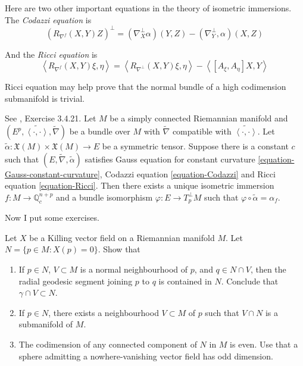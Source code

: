 \medskip\noindent

Here are two other important equations in the
theory of isometric immersions.
The {\it Codazzi equation} is
\begin{equation}
\label{equation-Codazzi}
(R_{\nabla^f}(X,Y)Z)^\perp
=(\nabla^\perp_X\alpha)(Y,Z)-(\nabla^\perp_Y,
\alpha)(X,Z)
\end{equation}

And the {\it Ricci equation} is
\begin{equation}
\label{equation-Ricci}
\left\langle{}R_{\nabla^f}(X,Y)\xi,\eta\right\rangle{}
=\left\langle{}R_{\nabla^\perp}(X,Y)\xi,\eta\right\rangle{}
-\left\langle{}[A_\xi,A_\eta]X,Y\right\rangle{}
\end{equation}

Ricci equation may help prove that the normal
bundle of a high codimension
submanifold is trivial.

\begin{theorem}
\label{theorem-funda-theor-subma}
See \cite{pet}, Exercise 3.4.21. Let $M$ be a
simply connected Riemannian
manifold and
$(E^p,\widetilde{\left\langle{}\cdot,\cdot\right\rangle{}},
\tilde{\nabla})$
be a
bundle over $M$ with $\tilde{\nabla}$
compatible with
$\widetilde{\left\langle{}\cdot,\cdot\right\rangle{}}$.
Let $\tilde{\alpha}:\mathfrak{X}(M)\times
\mathfrak{X}(M)\to E$ be a symmetric
tensor. Suppose there is a constant $c$ such
that
$(E,\tilde{\nabla},\tilde{\alpha})$ satisfies
Gauss equation for constant
curvature
\ref{equation-Gauss-constant-curvature},
Codazzi equation
\ref{equation-Codazzi} and Ricci equation
\ref{equation-Ricci}.
Then there exists a unique isometric
immersion $f:M \to \mathbb{Q}_c^{n+p}$ and a
bundle isomorphism $\varphi:E \to
T^\perp_pM$ such that
$\varphi\circ\tilde{\alpha}=\alpha_f$.
\end{theorem}

\medskip\noindent
Now I put some exercises.

\begin{exercise}
\label{exercise-singu-killi-vecto-field}
\begin{reference}
\cite[Exercise 12, Chapter VI]{doc}
\end{reference}
Let $X$ be a Killing vector field on a
Riemannian manifold $M$.
Let $N=\{p \in M: X(p)=0\}$. Show that
\begin{enumerate}
\item If $p\in N$, $V \subset M$ is a normal
neighbourhood of $p$,
and $q \in N \cap V$, then the radial
geodesic segment
joining $p$ to $q$ is contained in $N$.
Conclude that $\gamma \cap V\subset N$.

\item If $p \in N$, there exists a
neighbourhood $V \subset M$
of $p$ such that $V \cap N$ is a submanifold
of $M$.

\item The codimension of any connected
component of $N$ in $M$ is even.
Use that a sphere admitting a
nowhere-vanishing vector field
has odd dimension.
\end{enumerate}
\end{exercise}


